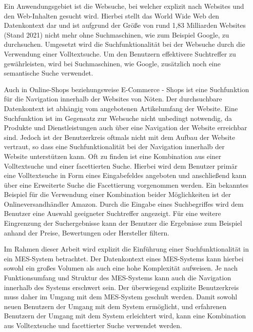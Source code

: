 Ein Anwendungsgebiet ist die Websuche, bei welcher explizit nach Websites und den Web-Inhalten gesucht wird. Hierbei stellt das World Wide Web den Datenkontext dar und ist aufgrund der Größe von rund 1,83 Milliarden Websites (Stand 2021) \cite{GuyFawkes.2021} nicht mehr ohne Suchmaschinen, wie zum Beispiel Google, zu durchsuchen. Umgesetzt wird die Suchfunktionalität bei der Websuche durch die Verwendung einer Volltextsuche. Um den Benutzern effektivere Suchtreffer zu gewährleisten, wird bei Suchmaschinen, wie Google, zusätzlich noch eine semantische Suche verwendet.

Auch in Online-Shops beziehungsweise E-Commerce - Shops ist eine Suchfunktion für die Navigation innerhalb der Websites von Nöten. Der durchsuchbare Datenkontext ist abhängig vom angebotenen Artikelumfang der Website. Eine Suchfunktion ist im Gegensatz zur Websuche nicht unbedingt notwendig, da Produkte und Dienstleistungen auch über eine Navigation der Website erreichbar sind. Jedoch ist der Benutzerkreis oftmals nicht mit dem Aufbau der Website vertraut, so dass eine Suchfunktionalität bei der Navigation innerhalb der Website unterstützen kann. Oft zu finden ist eine Kombination aus einer Volltextsuche und einer facettierten Suche. Hierbei wird dem Benutzer primär eine Volltextsuche in Form eines Eingabefeldes angeboten und anschließend kann über eine \glqq Erweiterte Suche\grqq{} die Facettierung vorgenommen werden. Ein bekanntes Beispiel für die Verwendung einer Kombination beider Möglichkeiten ist der Onlineversandhändler \glqq Amazon\grqq{}. Durch die Eingabe eines Suchbegriffes wird dem Benutzer eine Auswahl geeigneter Suchtreffer angezeigt. Für eine weitere Eingrenzung der Suchergebnisse kann der Benutzer die Ergebnisse zum Beispiel anhand der Preise, Bewertungen oder Hersteller filtern.

Im Rahmen dieser Arbeit wird explizit die Einführung einer Suchfunktionalität in ein MES-System betrachtet. Der Datenkontext eines MES-Systems kann hierbei sowohl ein großes Volumen als auch eine hohe Komplexität aufweisen. Je nach Funktionsumfang und Struktur des MES-Systems kann auch die Navigation innerhalb des Systems erschwert sein. Der überwiegend explizite Benutzerkreis muss daher im Umgang mit dem MES-System geschult werden. Damit sowohl neuen Benutzern der Umgang mit dem System ermöglicht, und erfahrenen Benutzern der Umgang mit dem System erleichtert wird, kann eine Kombination aus Volltextsuche und facettierter Suche verwendet werden.



